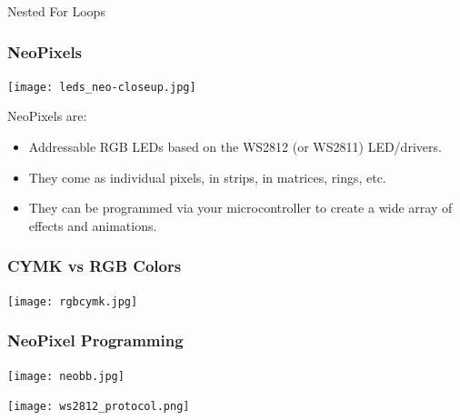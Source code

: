 \documentclass{beamer}
\begin{document}
\begin{frame}{Nested For Loops}
\lstnest
\end{frame}



\begin{frame}\frametitle{NeoPixels}
\begin{center}
\texttt{[image: leds\_neo-closeup.jpg]}
\end{center}
NeoPixels are:
\begin{itemize}
\item Addressable RGB LEDs based on the WS2812 (or WS2811) LED/drivers.
\item They come as individual pixels, in strips, in matrices, rings, etc.
\item They can be programmed via your microcontroller to create a wide array of effects and animations.
\end{itemize}
\end{frame}

\begin{frame}\frametitle{CYMK vs RGB Colors}
	\begin{center}	
	\texttt{[image: rgbcymk.jpg]}
	\end{center}
\end{frame}

\begin{frame}\frametitle{NeoPixel Programming}
\begin{center}
\texttt{[image: neobb.jpg]}

\vspace{0.5cm}
\texttt{[image: ws2812\_protocol.png]}
\end{center}
\end{frame}
\end{document}
